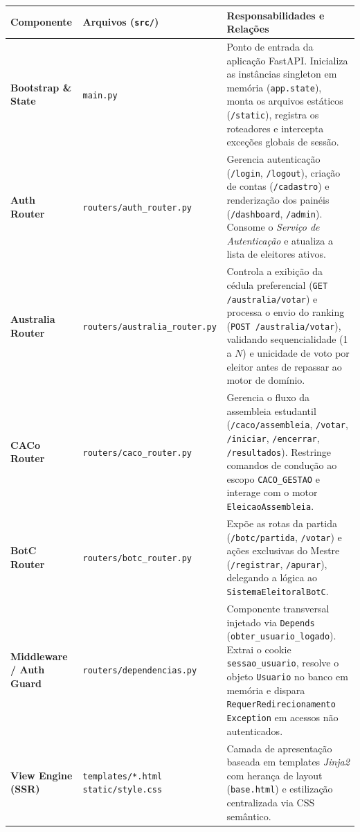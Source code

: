 \documentclass[12pt,a4paper]{article}
\begin{document}
\renewcommand{\arraystretch}{1.4}
\begin{longtable}[H]{|m{3.5cm}|m{6.5cm}|m{5cm}|}
\hline
\centering
\small
\textbf{Componente} & \textbf{Arquivos (\texttt{src/})} & \textbf{Responsabilidades e Relações} \\
\hline
\textbf{Bootstrap \& State} & \texttt{main.py} & Ponto de entrada da aplicação FastAPI. Inicializa as instâncias singleton em memória (\texttt{app.state}), monta os arquivos estáticos (\texttt{/static}), registra os roteadores e intercepta exceções globais de sessão. \\
\hline
\textbf{Auth Router} & \texttt{routers/auth\_router.py} & Gerencia autenticação (\texttt{/login}, \texttt{/logout}), criação de contas (\texttt{/cadastro}) e renderização dos painéis (\texttt{/dashboard}, \texttt{/admin}). Consome o \textit{Serviço de Autenticação} e atualiza a lista de eleitores ativos. \\
\hline
\textbf{Australia Router} & \texttt{routers/australia\_router.py} & Controla a exibição da cédula preferencial (\texttt{GET /australia/votar}) e processa o envio do ranking (\texttt{POST /australia/votar}), validando sequencialidade (1 a $N$) e unicidade de voto por eleitor antes de repassar ao motor de domínio. \\
\hline
\textbf{CACo Router} & \texttt{routers/caco\_router.py} & Gerencia o fluxo da assembleia estudantil (\texttt{/caco/assembleia}, \texttt{/votar}, \texttt{/iniciar}, \texttt{/encerrar}, \texttt{/resultados}). Restringe comandos de condução ao escopo \texttt{CACO\_GESTAO} e interage com o motor \texttt{EleicaoAssembleia}. \\
\hline
\textbf{BotC Router} & \texttt{routers/botc\_router.py} & Expõe as rotas da partida (\texttt{/botc/partida}, \texttt{/votar}) e ações exclusivas do Mestre (\texttt{/registrar}, \texttt{/apurar}), delegando a lógica ao \texttt{SistemaEleitoralBotC}. \\
\hline
\textbf{Middleware / Auth Guard} & \texttt{routers/dependencias.py} & Componente transversal injetado via \texttt{Depends} (\texttt{obter\_usuario\_logado}). Extrai o cookie \texttt{sessao\_usuario}, resolve o objeto \texttt{Usuario} no banco em memória e dispara \texttt{RequerRedirecionamento Exception} em acessos não autenticados. \\
\hline
\textbf{View Engine (SSR)} & \texttt{templates/*.html} \newline \texttt{static/style.css} & Camada de apresentação baseada em templates \textit{Jinja2} com herança de layout (\texttt{base.html}) e estilização centralizada via CSS semântico. \\

\end{longtable}
\end{document}
